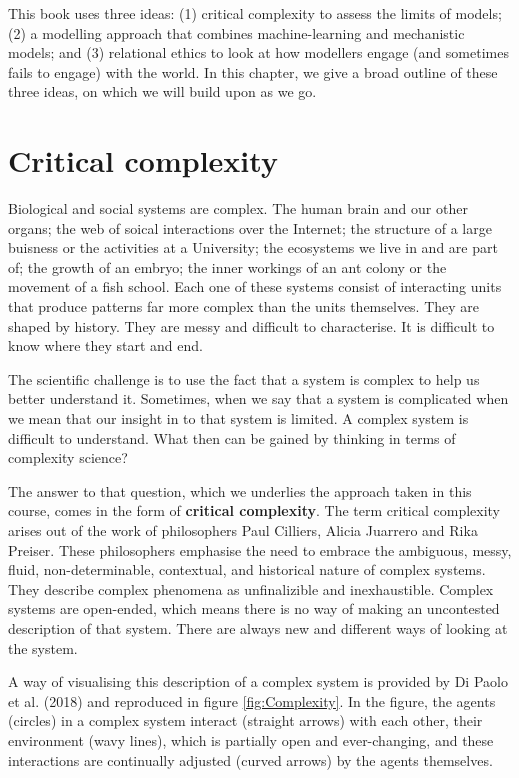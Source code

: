 


This book uses three ideas: (1) critical complexity to assess the limits of models; (2) a modelling approach that combines machine-learning and mechanistic models;  and (3) relational ethics to look at how modellers engage (and sometimes fails to engage) with the world. In this chapter, we give a broad outline of these three ideas, on which we will build upon as we go. 

\section{Critical complexity}

Biological and social systems are complex. The human brain and our other organs; the web of soical interactions over the Internet; the structure of a large buisness or the activities at a University; the ecosystems we live in and are part of; the growth of an embryo; the inner workings of an ant colony or the movement of a fish school. Each one of these systems consist of interacting units that produce patterns far more complex than the units themselves. They are shaped by history. They are messy and difficult to characterise. It is difficult to know where they start and end. 

The scientific challenge is to use the fact that a system is complex to help us better understand it. Sometimes, when we say that a system is complicated when we mean that our insight in to that system is limited. A complex system is difficult to understand. What then can be gained by thinking in terms of complexity science?

The answer to that question, which we underlies the approach taken in this course, comes in the form of {\bf critical complexity}. The term critical complexity arises out of the work of philosophers Paul Cilliers\cite{cilliers2002complexity,cilliers2016critical,cilliers2005complexity}, Alicia Juarrero\cite{juarrero1999dynamicsbook,juarrero2000dynamics} and Rika Preiser\cite{preiser2012problem,preiser2013deconstruction}. These philosophers emphasise the need to embrace the ambiguous, messy, fluid, non-determinable, contextual, and historical nature of complex systems. They describe complex phenomena as unfinalizible and inexhaustible. Complex systems are open-ended, which means there is no way of making an uncontested description of that system. There are always new and different ways of looking at the system.

A way of visualising this description of a complex system is provided by Di Paolo et al. (2018) and reproduced in figure \ref{fig:Complexity}. In the figure, the agents (circles) in a complex system interact (straight arrows) with each other, their environment (wavy lines), which is partially open and ever-changing, and these interactions are continually adjusted (curved arrows) by the agents themselves. 


